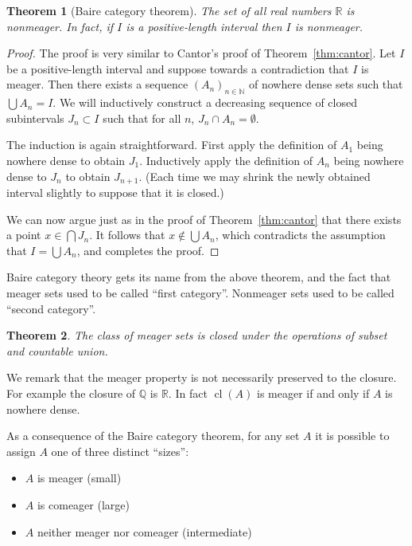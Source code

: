 \documentclass[11pt,oneside]{amsbook}
\newcommand{\N}{\mathbb N}
\newcommand{\Q}{\mathbb Q}
\newcommand{\R}{\mathbb R}
\DeclareMathOperator{\cl}{cl}
\theoremstyle{definition}
\theoremstyle{plain}
\newtheorem{theorem}{Theorem}[section]
\theoremstyle{definition}
\theoremstyle{remark}
\numberwithin{equation}{section}
\numberwithin{figure}{section}
\begin{document}
\begin{theorem}[Baire category theorem]
  \label{thm:baire}
  The set of all real numbers $\R$ is nonmeager. In fact, if $I$ is a positive-length interval then $I$ is nonmeager.
\end{theorem}

\begin{proof}
  The proof is very similar to Cantor's proof of Theorem~\ref{thm:cantor}. Let $I$ be a positive-length interval and suppose towards a contradiction that $I$ is meager. Then there exists a sequence $(A_n)_{n\in\N}$ of nowhere dense sets such that $\bigcup A_n=I$. We will inductively construct a decreasing sequence of closed subintervals $J_n\subset I$ such that for all $n$, $J_n\cap A_n=\emptyset$.

  The induction is again straightforward. First apply the definition of $A_1$ being nowhere dense to obtain $J_1$. Inductively apply the definition of $A_n$ being nowhere dense to $J_n$ to obtain $J_{n+1}$. (Each time we may shrink the newly obtained interval slightly to suppose that it is closed.)

  We can now argue just as in the proof of Theorem~\ref{thm:cantor} that there exists a point $x\in\bigcap J_n$. It follows that $x\notin\bigcup A_n$, which contradicts the assumption that $I=\bigcup A_n$, and completes the proof.
\end{proof}

Baire category theory gets its name from the above theorem, and the fact that meager sets used to be called ``first category''. Nonmeager sets used to be called ``second category''.

\begin{theorem}
  \label{thm:meager-pres}
  The class of meager sets is closed under the operations of subset and countable union.
\end{theorem}

We remark that the meager property is not necessarily preserved to the closure. For example the closure of $\Q$ is $\R$. In fact $\cl(A)$ is meager if and only if $A$ is nowhere dense.

As a consequence of the Baire category theorem, for any set $A$ it is possible to assign $A$ one of three distinct ``sizes'':

\begin{itemize}
  \item $A$ is meager (small)
  \item $A$ is comeager (large)
  \item $A$ neither meager nor comeager (intermediate)
\end{itemize}
\end{document}
